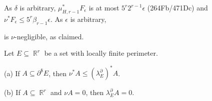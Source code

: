 {

\noindent As $\delta$ is arbitrary, $\mu_{H,r-1}^*F_{\epsilon}$ is at
most $5^r2^{r-1}\epsilon$ (264Fb/471Dc) and
$\nu^*F_{\epsilon}\le 5^r\beta_{r-1}\epsilon$.   As $\epsilon$ is
arbitrary,


\noindent is $\nu$-negligible, as claimed.
}%

 Let $E\subseteq\BbbR^r$ be a set with locally
finite perimeter.

(a) If $A\subseteq\partial^{\$}E$, then
$\nu^*A\le(\lambda^{\partial}_E)^*A$.

(b) If $A\subseteq\BbbR^r$ and $\nu A=0$, then
$\lambda^{\partial}_EA=0$.

